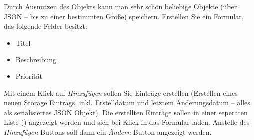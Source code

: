 %
\par Durch Ausnutzen des  Objekts kann man sehr schön
beliebige Objekte (über JSON – bis zu einer bestimmten Größe) speichern.
Erstellen Sie ein Formular, das folgende Felder besitzt:
%
\begin{itemize}
\item
Titel
\item
Beschreibung
\item
Priorität
\end{itemize}
%
\par Mit einem Klick auf \emph{Hinzufügen} sollen Sie Einträge erstellen
(Erstellen eines neuen Storage Eintrags, inkl. Erstelldatum und letztem
Änderungsdatum – alles als serialisiertes JSON Objekt). Die erstellten Einträge
sollen in einer seperaten Liste () angezeigt werden und sich bei
Klick in das Formular laden. Anstelle des \emph{Hinzufügen} Buttons soll dann
ein \emph{Ändern} Button angezeigt werden.